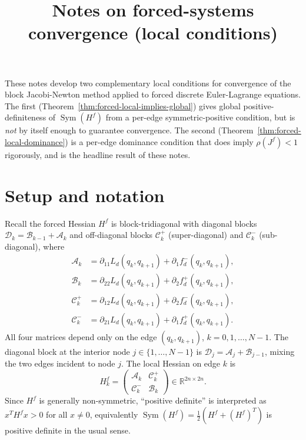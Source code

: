 \documentclass{article}
\title{Notes on forced-systems convergence (local conditions)}
\author{}
\date{}
\newcommand{\RR}{\mathbb{R}}
\newcommand{\Ld}{L_d}
\providecommand{\mdif}[1]{\partial_{#1}}
\renewcommand{\mdif}[1]{\partial_{#1}}
\newcommand{\Sym}{\operatorname{Sym}}
\begin{document}
\maketitle

These notes develop two complementary local conditions for convergence of the
block Jacobi-Newton method applied to forced discrete Euler-Lagrange equations.
The first (Theorem~\ref{thm:forced-local-implies-global}) gives global
positive-definiteness of $\Sym(H^f)$ from a per-edge symmetric-positive
condition, but is \emph{not} by itself enough to guarantee convergence. The
second (Theorem~\ref{thm:forced-local-dominance}) is a per-edge dominance
condition that does imply $\rho(J^f) < 1$ rigorously, and is the headline result
of these notes.

\section{Setup and notation}

Recall the forced Hessian $H^f$ is block-tridiagonal with diagonal blocks
$\mathcal{D}_k = \mathcal{B}_{k-1} + \mathcal{A}_k$ and off-diagonal blocks
$\mathcal{C}^+_k$ (super-diagonal) and $\mathcal{C}^-_k$ (sub-diagonal), where
\begin{align*}
    \mathcal{A}_k &= \mdif{11} \Ld(q_k, q_{k+1}) + \mdif{1} f_d^-(q_k, q_{k+1}), \\
    \mathcal{B}_k &= \mdif{22} \Ld(q_k, q_{k+1}) + \mdif{2} f_d^+(q_k, q_{k+1}), \\
    \mathcal{C}^+_k &= \mdif{12} \Ld(q_k, q_{k+1}) + \mdif{2} f_d^-(q_k, q_{k+1}), \\
    \mathcal{C}^-_k &= \mdif{21} \Ld(q_k, q_{k+1}) + \mdif{1} f_d^+(q_k, q_{k+1}).
\end{align*}
All four matrices depend only on the edge $(q_k, q_{k+1})$, $k = 0, 1, \dots, N-1$.
The diagonal block at the interior node $j \in \{1, \ldots, N-1\}$ is
$\mathcal{D}_j = \mathcal{A}_j + \mathcal{B}_{j-1}$, mixing the two edges incident
to node $j$. The local Hessian on edge $k$ is
\[
    H_k^f = \begin{pmatrix} \mathcal{A}_k & \mathcal{C}^+_k \\ \mathcal{C}^-_k & \mathcal{B}_k \end{pmatrix} \in \RR^{2n \times 2n}.
\]
Since $H^f$ is generally non-symmetric, ``positive definite'' is interpreted as
$x^T H^f x > 0$ for all $x \neq 0$, equivalently $\Sym(H^f) = \tfrac{1}{2}(H^f + (H^f)^T)$ is
positive definite in the usual sense.
\end{document}
